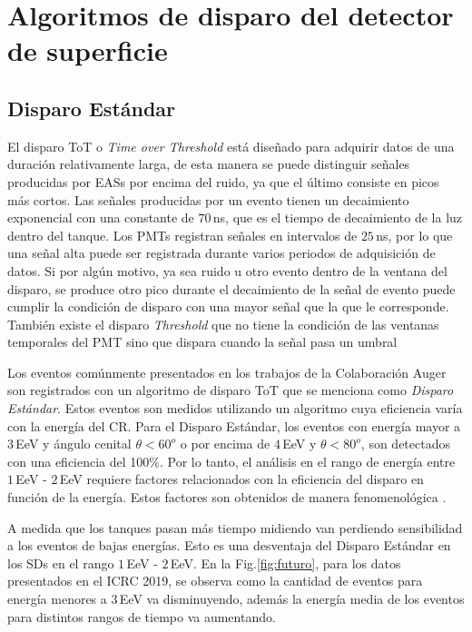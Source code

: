 \section{Algoritmos de disparo del detector de superficie} \label{triggers_caracteristicas}

\subsection{Disparo Estándar}

El disparo ToT o \emph{Time over Threshold} está diseñado para adquirir datos de una duración relativamente larga, de esta manera se puede distinguir señales producidas por EASs por encima del ruido, ya que el último consiste en picos más cortos. Las señales producidas por un evento tienen un decaimiento exponencial con una constante de $70\,$ns, que es el tiempo de decaimiento de la luz dentro del tanque. Los PMTs registran señales en intervalos de $25\,$ns, por lo que una señal alta puede ser registrada durante varios periodos de adquisición de datos. Si por algún motivo, ya sea ruido u otro evento dentro de la ventana del disparo, se produce otro pico durante el decaimiento de la señal de evento puede cumplir la condición de disparo con una mayor señal que la que le corresponde. También existe el disparo \emph{Threshold} que no tiene la condición de las ventanas temporales del PMT sino que dispara cuando la señal pasa un umbral

{Los eventos comúnmente presentados en los trabajos de la Colaboración Auger son registrados con un algoritmo de disparo ToT que se menciona como \emph{Disparo Estándar}.  Estos eventos son medidos utilizando un algoritmo cuya eficiencia varía con la energía del CR. Para el Disparo Estándar, los eventos con energía mayor a $3\,$EeV y ángulo cenital $\theta<60^o$ o  por encima de $4\,$EeV y $\theta<80^o$, son detectados con una eficiencia del 100\%. Por lo tanto, el análisis en el rango de energía entre $1\,$EeV - $2\,$EeV requiere factores relacionados con la eficiencia del disparo en función de la energía. Estos factores son obtenidos de manera fenomenológica \cite{taborda}.}


A medida que los tanques pasan más tiempo midiendo van perdiendo sensibilidad a los eventos de bajas energías. Esto es una desventaja del Disparo Estándar en los SDs en el rango $1\,$EeV - $2\,$EeV.  En la Fig.\ref{fig:futuro}, para los datos presentados en el ICRC 2019, se observa como la cantidad de eventos para energía menores a $3\,$EeV va disminuyendo, además la energía media de los eventos para distintos rangos de tiempo va aumentando.

